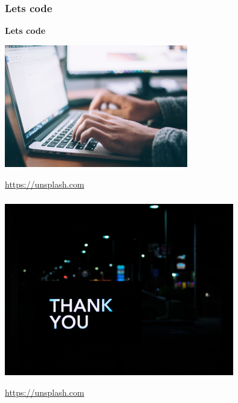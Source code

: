 \documentclass{beamer}
\newcommand{\source}[2]{
	\begin{flushright}
		\hfill {\scriptsize \href{#1}{#2}}	
	\end{flushright}
}
\begin{document}
\begin{frame}
\frametitle{\textbf{Lets code}}

\begin{minipage}{0.45\textwidth}
\begin{center}
    {\fontsize{50}{60}\selectfont \textbf{Lets code}}
\end{center}
\end{minipage}
\begin{minipage}{0.45\textwidth}
    \hspace{15mm}
    \includegraphics[width=80mm]{code.jpg}
    \source{https://unsplash.com/photos/npxXWgQ33ZQ}{https://unsplash.com}
\end{minipage}

\end{frame}

\begin{frame}
\frametitle{}

\includegraphics[width=100mm]{Thanks.jpg}
\source{https://unsplash.com/photos/VyC0YSFRDTU}{https://unsplash.com}

\end{frame}
\end{document}
